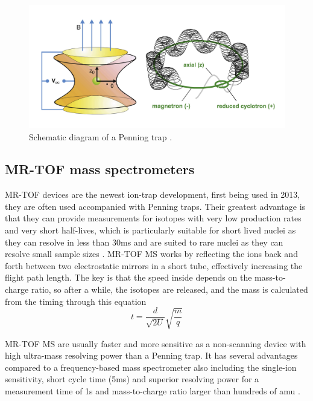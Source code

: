 \begin{figure}[H]
    \centering
    \includegraphics[width=.5\textwidth]{images/MS_penningtrap.png}
    \caption{Schematic diagram of a Penning trap \cite{famiano_nuclear_2019}.}\label{fig:MS_PT}
\end{figure}

\subsection{MR-TOF mass spectrometers}
MR-TOF devices are the newest ion-trap development, first being used in 2013, they are often used accompanied with Penning traps.
Their greatest advantage is that they can provide measurements for isotopes with very low production rates and very short half-lives, which is particularly suitable for short lived nuclei as they can resolve in less than 30ms and are suited to rare nuclei as they can resolve small sample sizes \cite{noauthor_isoltraps_nodate}.
MR-TOF MS works by reflecting the ions back and forth between two electrostatic mirrors in a short tube, effectively increasing the flight path length.
The key is that the speed inside depends on the mass-to-charge ratio, so after a while, the isotopes are released, and the mass is calculated from the timing through this equation
\begin{equation}
    t = \frac{d}{\sqrt{2U}}\sqrt{\frac{m}{q}}
\end{equation}

MR-TOF MS are usually faster and more sensitive as a non-scanning device with high ultra-mass resolving power than a Penning trap.
It has several advantages compared to a frequency-based mass spectrometer also including the single-ion sensitivity, short cycle time (5ms) and superior resolving power for a measurement time of 1s and mass-to-charge ratio larger than hundreds of amu \cite{dickel_multiple-reflection_2013}.
